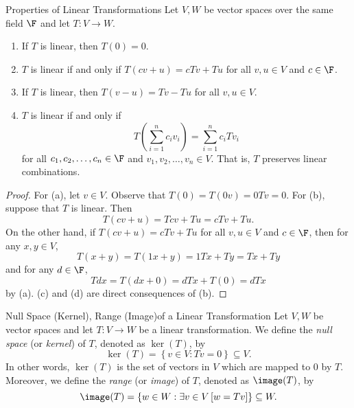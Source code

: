\documentclass[linearalgebraI]{subfiles}
\begin{document}
    \begin{prop}{Properties of Linear Transformations}
        Let $V, W$ be vector spaces over the same field $\F$ and let $T:V\to W$.
        \begin{enumerate}
            \item If $T$ is linear, then $T(0)=0$.
            \item $T$ is linear if and only if $T(cv+u)=cTv+Tu$ for all $v,u\in V$ and $c\in\F$.
            \item If $T$ is linear, then $T(v-u)=Tv-Tu$ for all $v,u\in V$.
            \item $T$ is linear if and only if
                \begin{equation*}
                    T\left( \sum^{n}_{i=1} c_iv_i \right) = \sum^{n}_{i=1} c_iTv_i
                \end{equation*}
                for all $c_1,c_2,\ldots,c_n\in\F$ and $v_1,v_2,\ldots,v_n\in V$. That is, $T$ preserves linear combinations.
        \end{enumerate}
    \end{prop}

    \begin{proof}
        For (a), let $v\in V$. Observe that $T(0) = T(0v) = 0Tv = 0$. For (b), suppose that $T$ is linear. Then
        \begin{equation*}
            T(cv+u) = Tcv + Tu = cTv + Tu.
        \end{equation*}
        On the other hand, if $T(cv+u) = cTv+Tu$ for all $v,u\in V$ and $c\in\F$, then for any $x,y\in V$,
        \begin{equation*}
            T(x+y) = T(1x+y) = 1Tx+Ty = Tx+Ty
        \end{equation*}
        and for any $d\in\F$,
        \begin{equation*}
            Tdx = T(dx+0) = dTx + T(0) = dTx
        \end{equation*}
        by (a). (c) and (d) are direct consequences of (b).
    \end{proof}

    \begin{definition}{Null Space (Kernel), Range (Image)}{of a Linear Transformation}
        Let $V, W$ be vector spaces and let $T:V\to W$ be a linear transformation. We define the \emph{null space} (or \emph{kernel}) of $T$, denoted as $\ker(T)$, by
        \begin{equation*}
            \ker(T) = \left\lbrace v\in V: Tv=0 \right\rbrace \subseteq V.
        \end{equation*}
        In other words, $\ker(T)$ is the set of vectors in $V$ which are mapped to 0 by $T$. Moreover, we define the \emph{range} (or \emph{image}) of $T$, denoted as $\image(T)$, by
        \begin{equation*}
            \image(T) = \left\lbrace w\in W: \exists v\in V\left[ w=Tv \right] \right\rbrace \subseteq W.
        \end{equation*}
    \end{definition}
\end{document}
